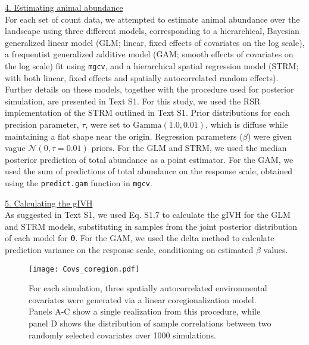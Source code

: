 \documentclass[12pt,fleqn]{article}
\begin{document}
\begin{flushleft}
\underline{4. Estimating animal abundance} \\

For each set of count data, we attempted to estimate animal abundance over the landscape using three different models, corresponding to a hierarchical, Bayesian generalized linear model (GLM; linear, fixed effects of covariates on the log scale), a frequentist generalized additive model (GAM; smooth effects of covariates on the log scale) fit using \texttt{mgcv}, and a hierarchical spatial regression model (STRM; with both linear, fixed effects and spatially autocorrelated random effects).  Further details on these models, together with the procedure used for posterior simulation, are presented in Text S1.  For this study, we used the RSR implementation of the STRM outlined in Text S1.  Prior distributions for each precision parameter, $\tau$, were set to $\text{Gamma}(1.0,0.01)$, which is diffuse while maintaining a flat shape near the origin.  Regression parameters ($\beta$) were given vague $\mathcal{N}(0,\tau=0.01)$ priors.
For the GLM and STRM, we used the median posterior prediction of total abundance as a point estimator.  For the GAM, we used the sum of predictions of total abundance on the response scale, obtained using the \texttt{predict.gam} function in \texttt{mgcv}.


\underline{5. Calculating the gIVH} \\

As suggested in Text S1, we used Eq. S1.7 to calculate the gIVH for the GLM and STRM models, substituting in samples from the joint posterior distribution of each model for $\boldsymbol{\theta}$.  For the GAM, we used the delta method \citep{Dorfman1938} to calculate prediction variance on the response scale, conditioning on estimated $\beta$ values.


\renewcommand{\refname}{Literature Cited}




\end{flushleft}


\begin{figure}[!h]
\begin{center}
\texttt{[image: Covs\_coregion.pdf]}
\end{center}
\caption{For each simulation, three spatially autocorrelated environmental covariates were generated via a linear coregionalization model.  Panels A-C show a single realization from this procedure, while panel D shows the distribution of sample correlations between two randomly selected covariates over 1000 simulations.}
\label{fig:covs}
\end{figure}
\end{document}
